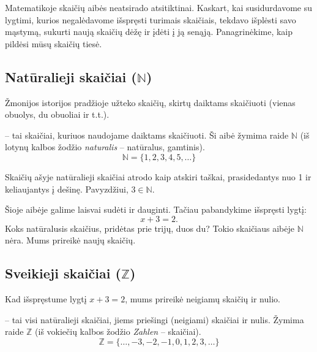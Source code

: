 \documentclass[11pt,a4paper]{scrartcl}
\begin{document}
Matematikoje skaičių aibės neatsirado atsitiktinai. Kaskart, kai susidurdavome su lygtimi, kurios negalėdavome išspręsti turimais skaičiais, tekdavo išplėsti savo mąstymą, sukurti naują skaičių dėžę ir įdėti į ją senąją. Panagrinėkime, kaip pildėsi mūsų skaičių tiesė.

\subsection{Natūralieji skaičiai ($\mathbb{N}$)}

Žmonijos istorijos pradžioje užteko skaičių, skirtų daiktams skaičiuoti (vienas obuolys, du obuoliai ir t.t.).

\begin{definition}
 -- tai skaičiai, kuriuos naudojame daiktams skaičiuoti. Ši aibė žymima raide $\mathbb{N}$ (iš lotynų kalbos žodžio \textit{naturalis} -- natūralus, gamtinis).
\[ \mathbb{N} = \{1, 2, 3, 4, 5, \dots\} \]
\end{definition}

Skaičių ašyje natūralieji skaičiai atrodo kaip atskiri taškai, prasidedantys nuo 1 ir keliaujantys į dešinę. Pavyzdžiui, $3 \in \mathbb{N}$.

\begin{center}
\end{center}

Šioje aibėje galime laisvai sudėti ir dauginti. Tačiau pabandykime išspręsti lygtį:
\[ x + 3 = 2. \]
Koks natūralusis skaičius, pridėtas prie trijų, duos du? Tokio skaičiaus aibėje $\mathbb{N}$ nėra. Mums prireikė naujų skaičių.

\subsection{Sveikieji skaičiai ($\mathbb{Z}$)}

Kad išspręstume lygtį $x + 3 = 2$, mums prireikė neigiamų skaičių ir nulio.

\begin{definition}
 -- tai visi natūralieji skaičiai, jiems priešingi (neigiami) skaičiai ir nulis. Žymima raide $\mathbb{Z}$ (iš vokiečių kalbos žodžio \textit{Zahlen} -- skaičiai).
\[ \mathbb{Z} = \{\dots, -3, -2, -1, 0, 1, 2, 3, \dots\} \]
\end{definition}
\end{document}
